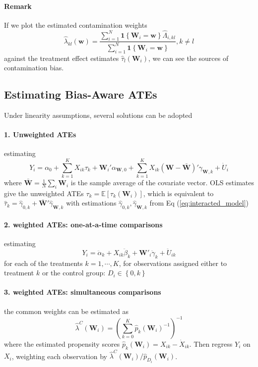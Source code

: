\documentclass[twoside]{article}
\begin{document}
\paragraph*{Remark} If we plot the estimated contamination weights 
$$
\hat{\lambda}_{kl}(\mathbf{w}) = \frac{\sum^N_{i=1}\mathbf{1}\left\{\mathbf{W}_i=\mathbf{w}\right\}\hat{\Lambda}_{i,kl}}{\sum^N_{i=1}\mathbf{1}\left\{\mathbf{W}_i=\mathbf{w}\right\}},k\neq l
$$
against the treatment effect estimates $\hat{\tau}_l(\mathbf{W}_i)$, we can see the sources of contamination bias.

\subsection{Estimating Bias-Aware ATEs}
Under linearity assumptions, several solutions can be adopted
\paragraph*{1. Unweighted ATEs} estimating 
\begin{equation}
    Y_i = \alpha_0 + \sum^K_{k=1}X_{ik}\tau_k + \mathbf{W}_i' \alpha_{\mathbf{W},0} + \sum^K_{k=1}X_{ik}\left(\mathbf{W}-\bar{\mathbf{W}}\right)'\gamma_{\mathbf{W},k} +\dot{U}_i
\end{equation}
where $\bar{\mathbf{W}} = \frac{1}{N}\sum_i \mathbf{W}_i$ is the sample average of the covariate vector. OLS estimates give the unweighted ATEs $\tau_k = \mathbb{E}\left[\tau_k(\mathbf{W}_i)\right]$, which is equivalent to $\hat{\tau}_k = \hat{\gamma}_{0,k} + \bar{\mathbf{W}}'\hat{\gamma}_{\mathbf{W},k}$ with estimations $\hat{\gamma}_{0,k},\hat{\gamma}_{\mathbf{W},k}$ from Eq (\ref{eq:interacted_model})

\paragraph*{2. weighted ATEs: one-at-a-time comparisons}
estimating 
    \begin{equation}
        Y_i = \ddot{\alpha}_k + X_{ik}\ddot{\beta}_k + \mathbf{W}'_i \ddot{\gamma}_k +\ddot{U}_{ik}
    \end{equation}
for each of the treatments $k=1,\cdots,K$, for observations assigned either to treatment $k$ or the control group: $D_i\in\left\{0,k\right\}$

\paragraph*{3. weighted ATEs: simultaneous comparisons}
the common weights can be estimated as 
\begin{equation}
    \hat{\lambda}^C(\mathbf{W}_i) = \left( \sum^K_{k=0} \hat{p}_k \left(\mathbf{W}_i\right)^{-1} \right)^{-1}
\end{equation}
where the estimated propensity scores $\hat{p}_k(\mathbf{W}_i) = X_{ik} - \dot{X}_{ik}$. Then regress $Y_i$ on $X_i$, weighting each observation by $\hat{\lambda}^C(\mathbf{W}_i)/\hat{p}_{D_i}(\mathbf{W}_i)$.
\end{document}
